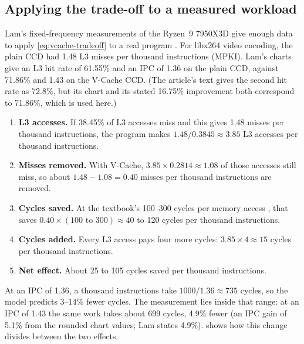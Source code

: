 \subsection{Applying the trade-off to a measured workload}
\label{sec:tradeoff-example}
Lam's fixed-frequency measurements of the Ryzen~9 7950X3D give enough data to apply \cref{eq:vcache-tradeoff} to a real program \cite{lamAMDs7950X3DZen2023}. For libx264 video encoding, the plain CCD had 1.48 L3 misses per thousand instructions (MPKI). Lam's charts give an L3 hit rate of 61.55\% and an IPC of 1.36 on the plain CCD, against 71.86\% and 1.43 on the V-Cache CCD. (The article's text gives the second hit rate as 72.8\%, but its chart and its stated 16.75\% improvement both correspond to 71.86\%, which is used here.)
\begin{enumerate}
  \item \textbf{L3 accesses.} If 38.45\% of L3 accesses miss and this gives 1.48 misses per thousand instructions, the program makes $1.48 / 0.3845 \approx 3.85$ L3 accesses per thousand instructions.
  \item \textbf{Misses removed.} With V-Cache, $3.85 \times 0.2814 \approx 1.08$ of those accesses still miss, so about $1.48 - 1.08 = 0.40$ misses per thousand instructions are removed.
  \item \textbf{Cycles saved.} At the textbook's 100--300 cycles per memory access \cite[sec.~12.4.8]{sarangi2025basic}, that saves $0.40 \times (100\text{ to }300) \approx 40$ to 120 cycles per thousand instructions.
  \item \textbf{Cycles added.} Every L3 access pays four more cycles: $3.85 \times 4 \approx 15$ cycles per thousand instructions.
  \item \textbf{Net effect.} About 25 to 105 cycles saved per thousand instructions.
\end{enumerate}
At an IPC of 1.36, a thousand instructions take $1000/1.36 \approx 735$ cycles, so the model predicts 3--14\% fewer cycles. The measurement lies inside that range: at an IPC of 1.43 the same work takes about 699 cycles, 4.9\% fewer (an IPC gain of 5.1\% from the rounded chart values; Lam states 4.9\%).  shows how this change divides between the two effects.

